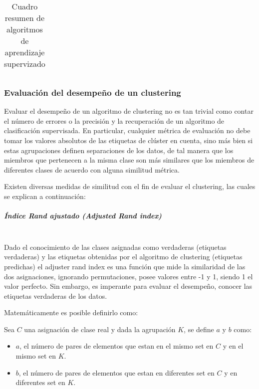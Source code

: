 \begin{table}[]
\begin{tabular}{|l|l|l|l|l|}
	\end{tabular}
	
	
	\caption{Cuadro resumen de algoritmos de aprendizaje supervizado}
	\label{cuadroResumen}
\end{table}

\subsubsection{Evaluación del desempeño de un clustering}\label{evaluacion}

Evaluar el desempeño de un algoritmo de clustering no es tan trivial como contar el número de errores o la precisión y la recuperación de un algoritmo de clasificación supervisada. En particular, cualquier métrica de evaluación no debe tomar los valores absolutos de las etiquetas de clúster en cuenta, sino más bien si estas agrupaciones definen separaciones de los datos, de tal manera que los miembros que pertenecen a la misma clase son más similares que los miembros de diferentes clases de acuerdo con alguna similitud métrica.

Existen diversas medidas de similitud con el fin de evaluar el clustering, las cuales se explican a continuación:

\subparagraph{Índice Rand ajustado (Adjusted Rand index)\\\\}

Dado el conocimiento de las clases asignadas como verdaderas (etiquetas verdaderas) y las etiquetas obtenidas por el algoritmo de clustering (etiquetas predichas) el adjuster rand index es una función que mide la similaridad de las dos asignaciones, ignorando permutaciones, posee valores entre -1 y 1, siendo 1 el valor perfecto. Sin embargo, es imperante para evaluar el desempeño, conocer las etiquetas verdaderas de los datos.

Matemáticamente es posible definirlo como:

Sea $C$ una asignación de clase real y dada la agrupación $K$, se define $a$ y $b$ como:

\begin{itemize}
	
	\item $a$, el número de pares de elementos que estan en el mismo set en $C$ y en el mismo set en $K$.
	\item $b$, el número de pares de elementos que estan en diferentes set en $C$ y en diferentes set en $K$.
\end{itemize}

